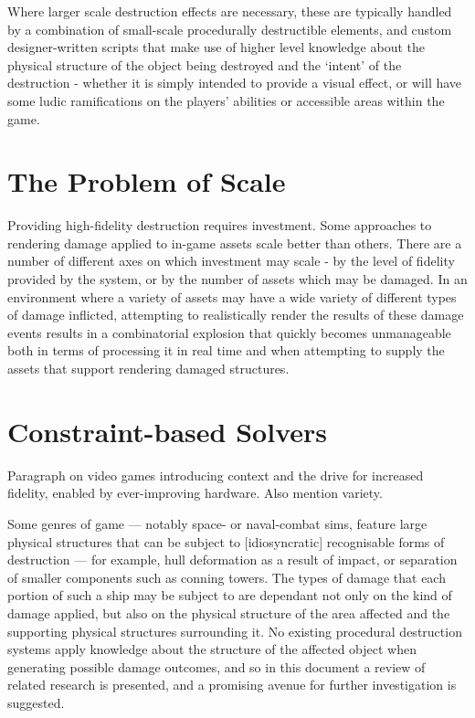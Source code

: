 \documentclass[11pt]{report}
\begin{document}
	Where larger scale destruction effects are necessary, these are typically handled by a combination of small-scale procedurally destructible elements, and custom designer-written scripts that make use of higher level knowledge about the physical structure of the object being destroyed and the `intent' of the destruction - whether it is simply intended to provide a visual effect, or will have some ludic ramifications on the players' abilities or accessible areas within the game.

	\section{The Problem of Scale}
	Providing high-fidelity destruction requires investment. Some approaches to rendering damage applied to in-game assets scale better than others. There are a number of different axes on which investment may scale - by the level of fidelity provided by the system, or by the number of assets which may be damaged. In an environment where a variety of assets may have a wide variety of different types of damage inflicted, attempting to realistically render the results of these damage events results in a combinatorial explosion that quickly becomes unmanageable both in terms of processing it in real time and when attempting to supply the assets that support rendering damaged structures.
	
	\section{Constraint-based Solvers}
	Paragraph on video games introducing context and the drive for increased fidelity, enabled by ever-improving hardware. Also mention variety.



	Some genres of game --- notably space- or naval-combat sims, feature large physical structures that can be subject to [idiosyncratic] recognisable forms of destruction --- for example, hull deformation as a result of impact, or separation of smaller components such as conning towers. The types of damage that each portion of such a ship may be subject to are dependant not only on the kind of damage applied, but also on the physical structure of the area affected and the supporting physical structures surrounding it. No existing procedural destruction systems apply knowledge about the structure of the affected object when generating possible damage outcomes, and so in this document a review of related research is presented, and a promising avenue for further investigation is suggested.
\end{document}
